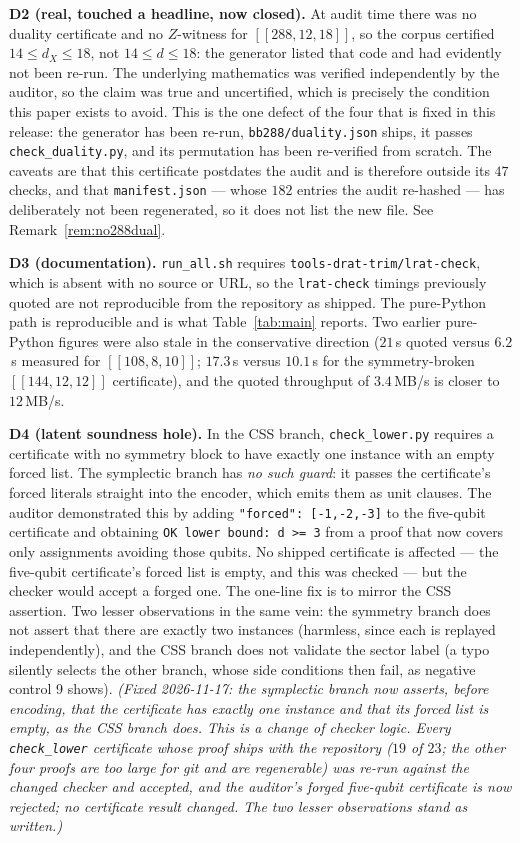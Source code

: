 \documentclass[11pt]{amsart}
\newcommand{\dX}{d_{X}}
\newcommand{\gross}{[[144,12,12]]}
\theoremstyle{plain}
\theoremstyle{definition}
\theoremstyle{remark}
\begin{document}
\smallskip
\noindent\textbf{D2 (real, touched a headline, now closed).} At audit time
there was no duality certificate and no $Z$-witness for $[[288,12,18]]$, so
the corpus certified $14\le\dX\le18$, not $14\le d\le18$: the generator listed
that code and had evidently not been re-run. The underlying mathematics was
verified independently by the auditor, so the claim was true and uncertified,
which is precisely the condition this paper exists to avoid. This is the one
defect of the four that is fixed in this release: the generator has been
re-run, \texttt{bb288/duality.json} ships, it passes
\texttt{check\_duality.py}, and its permutation has been re-verified from
scratch. The caveats are that this certificate postdates the audit and is
therefore outside its $47$ checks, and that \texttt{manifest.json} --- whose
$182$ entries the audit re-hashed --- has deliberately not been regenerated,
so it does not list the new file. See Remark~\ref{rem:no288dual}.

\smallskip
\noindent\textbf{D3 (documentation).} \texttt{run\_all.sh} requires
\texttt{tools-drat-trim/lrat-check}, which is absent with no source or URL, so
the \texttt{lrat-check} timings previously quoted are not reproducible from
the repository as shipped. The pure-Python path is reproducible and is what
Table~\ref{tab:main} reports. Two earlier pure-Python figures were also stale
in the conservative direction ($21$\,s quoted versus $6.2$\,s measured for
$[[108,8,10]]$; $17.3$\,s versus $10.1$\,s for the symmetry-broken $\gross$
certificate), and the quoted throughput of $3.4$\,MB/s is closer to $12$\,MB/s.

\smallskip
\noindent\textbf{D4 (latent soundness hole).} In the CSS branch,
\texttt{check\_lower.py} requires a certificate with no symmetry block to have
exactly one instance with an empty forced list. The symplectic branch has
\emph{no such guard}: it passes the certificate's forced literals straight into
the encoder, which emits them as unit clauses. The auditor demonstrated this by
adding \texttt{"forced": [-1,-2,-3]} to the five-qubit certificate and
obtaining \texttt{OK lower bound: d >= 3} from a proof that now covers only
assignments avoiding those qubits. No shipped certificate is affected --- the
five-qubit certificate's forced list is empty, and this was checked --- but the
checker would accept a forged one. The one-line fix is to mirror the CSS
assertion. Two lesser observations in the same vein: the symmetry branch does
not assert that there are exactly two instances (harmless, since each is
replayed independently), and the CSS branch does not validate the sector label
(a typo silently selects the other branch, whose side conditions then fail, as
negative control 9 shows). \emph{(Fixed 2026-11-17: the symplectic branch now
asserts, before encoding, that the certificate has exactly one instance and
that its forced list is empty, as the CSS branch does. This is a change of
checker logic. Every \texttt{check\_lower} certificate whose proof ships with
the repository ($19$ of $23$; the other four proofs are too large for git and
are regenerable) was re-run against the changed checker and accepted, and the
auditor's forged five-qubit certificate is now rejected; no certificate result
changed. The two lesser observations stand as
written.)}
\end{document}
